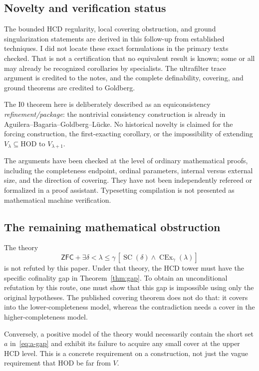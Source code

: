 \documentclass[11pt,letterpaper]{article}
\theoremstyle{definition}
\newcommand{\ZFC}{\mathsf{ZFC}}
\newcommand{\HOD}{\mathrm{HOD}}
\newcommand{\SC}{\operatorname{SC}}
\newcommand{\CEx}{\operatorname{CEx}}
\newcommand{\Izero}{\mathrm{I0}}
\begin{document}
\subsection{Novelty and verification status}

The bounded HCD regularity, local covering obstruction, and ground
singularization statements are derived in this follow-up from established
techniques. I did not locate these exact formulations in the primary texts
checked. That is not a certification that no equivalent result is known;
some or all may already be recognized corollaries by specialists. The
ultrafilter trace argument is credited to the notes, and the complete
definability, covering, and ground theorems are credited to Goldberg.

The $\Izero$ theorem here is deliberately described as an equiconsistency
\emph{refinement/package}: the nontrivial consistency construction is already
in Aguilera--Bagaria--Goldberg--L\"ucke. No historical novelty is claimed for
the forcing construction, the first-exacting corollary, or the impossibility
of extending $V_\lambda\subseteq\HOD$ to $V_{\lambda+1}$.

The arguments have been checked at the level of ordinary mathematical proofs,
including the completeness endpoint, ordinal parameters, internal versus
external size, and the direction of covering. They have not been independently
refereed or formalized in a proof assistant. Typesetting compilation is not
presented as mathematical machine verification.

\subsection{The remaining mathematical obstruction}

The theory
\[
 \ZFC+\exists\delta<\lambda\leq\gamma\,
       [\SC(\delta)\wedge\CEx_\gamma(\lambda)]
\]
is not refuted by this paper. Under that theory, the HCD tower must have the
specific cofinality gap in Theorem~\ref{thm:gap}. To obtain an unconditional
refutation by this route, one must show that this gap is impossible using only
the original hypotheses. The published covering theorem does not do that:
it covers into the lower-completeness model, whereas the contradiction needs
a cover in the higher-completeness model.

Conversely, a positive model of the theory would necessarily contain the
short set $a$ in~\eqref{eq:a-gap} and exhibit its failure to acquire any small
cover at the upper HCD level. This is a concrete requirement on a construction,
not just the vague requirement that HOD be far from $V$.
\end{document}
